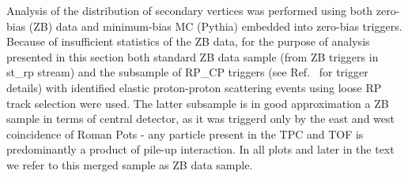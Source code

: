 Analysis of the distribution of secondary vertices was performed using both zero-bias (ZB) data and minimum-bias MC (Pythia) embedded into zero-bias triggers. Because of insufficient statistics of the ZB data, for the purpose of analysis presented in this section both standard ZB data sample (from ZB triggers in st\_rp stream) and the subsample of RP\_CP triggers (see Ref.~\cite{onlineRpTriggersMonitoring} for trigger details) with identified elastic proton-proton scattering events using loose RP track selection were used. The latter subsample is in good approximation a ZB sample in terms of central detector, as it was triggerd only by the east and west coincidence of Roman Pots - any particle present in the TPC and TOF is predominantly a product of pile-up interaction. In all plots and later in the text we refer to this merged sample as ZB data sample. 

